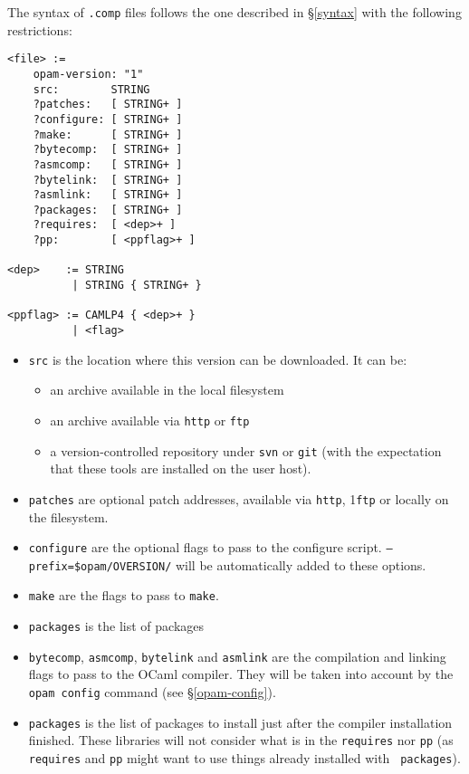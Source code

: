 \documentclass[a4paper,11pt]{article}
\begin{document}
The syntax of {\tt .comp} files follows the one described in
\S\ref{syntax} with the following restrictions:

{
\begin{Verbatim}[frame=single]
<file> :=
    opam-version: "1"
    src:        STRING
    ?patches:   [ STRING+ ]
    ?configure: [ STRING+ ]
    ?make:      [ STRING+ ]
    ?bytecomp:  [ STRING+ ]
    ?asmcomp:   [ STRING+ ]
    ?bytelink:  [ STRING+ ]
    ?asmlink:   [ STRING+ ]
    ?packages:  [ STRING+ ]
    ?requires:  [ <dep>+ ]
    ?pp:        [ <ppflag>+ ]

<dep>    := STRING
          | STRING { STRING+ }

<ppflag> := CAMLP4 { <dep>+ }
          | <flag>
\end{Verbatim}
}
\begin{itemize}

\item {\tt src} is the location where this version can be downloaded. It can be:
\begin{itemize}
\item an archive available in the local filesystem
\item an archive available via {\tt http} or {\tt ftp}
\item a version-controlled repository under {\tt svn} or {\tt git}
  (with the expectation that these tools are installed on the user host).
\end{itemize}

\item {\tt patches} are optional patch addresses, available via {\tt http}, 1{\tt ftp}
  or locally on the filesystem.

\item {\tt configure} are the optional flags to pass to the configure
  script. {\tt --prefix=\$opam/OVERSION/} will be automatically added
  to these options.

\item {\tt make} are the flags to pass to {\tt make}.

\item {\tt packages} is the list of packages

\item {\tt bytecomp}, {\tt asmcomp}, {\tt bytelink} and {\tt asmlink}
  are the compilation and linking flags to pass to the OCaml
  compiler. They will be taken into account by the \verb+opam config+
  command (see \S\ref{opam-config}).

\item {\tt packages} is the list of packages to install just after the
  compiler installation finished. These libraries will not consider
  what is in the {\tt requires} nor {\tt pp} (as {\tt requires} and
  {\tt pp} might want to use things already installed with {\tt
    packages}).


\end{itemize}
\end{document}

